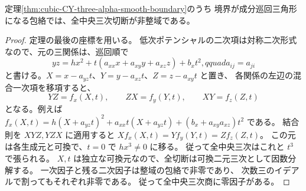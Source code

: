 \begin{corollary}\label{cor:cubic-CY-three-alpha-cyclic-triangle-excluded}
定理\ref{thm:cubic-CY-three-alpha-smooth-boundary}のうち
境界が成分巡回三角形になる包絡では、全中央三次切断が非整域である。
\end{corollary}
\begin{proof}
定理の最後の座標を用いる。
低次ポテンシャルの二次項は対称二次形式なので、元の三関係は、巡回順で
\[
 yz=h x^2+t(a_{xx}x+a_{xy}y+a_{xz}z)+b_x t^2,qquad
 a_{ij}=a_{ji}
\]
と書ける。$X=x-a_{yz}t$、$Y=y-a_{xz}t$、$Z=z-a_{xy}t$ と置き、
各関係の左辺の混合一次項を移項すると、
\[
 YZ=f_x(X,t),\qquad ZX=f_y(Y,t),\qquad XY=f_z(Z,t)
\]
となる。例えば
$f_x(X,t)=h(X+a_{yz}t)^2+a_{xx}t(X+a_{yz}t)
 +(b_x+a_{xy}a_{xz})t^2$ である。
結合則を $XYZ,YZX$ に適用すると
$Xf_x(X,t)=Yf_y(Y,t)=Zf_z(Z,t)$。
この元は各生成元と可換で、$t=0$ で $h x^3\ne0$ に移る。
従って全中央三次はこれと $t^3$ で張られる。
$X,t$ は独立な可換元なので、全切断は可換二元三次として因数分解する。
一次因子と残る二次因子は整域の包絡で非零であり、
次数三のイデアルで割ってもそれぞれ非零である。
従って全中央三次商に零因子がある。
\end{proof}
